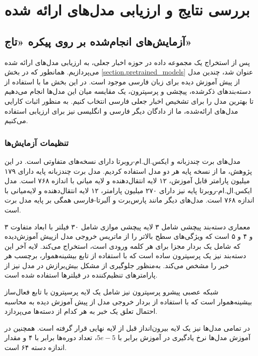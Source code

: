 \chapter{بررسی نتایج و ارزیابی مدل‌های ارائه شده}


\section{آزمایش‌های انجام‌شده بر روی پیکره «تاج»}
پس از استخراج یک مجموعه داده در حوزه اخبار جعلی، به ارزیابی مدل‌های ارائه شده می‌پردازیم. همانطور که در بخش \ref{section.pretrained_models} عنوان شد، چندین مدل از پیش آموزش‌ دیده برای زبان‌ فارسی موجود است. در این بخش ما با استفاده از دسته‌بند‌های ذکرشده، پیچشی و پرسپترون، یک مقایسه میان این مدل‌ها انجام می‌دهیم تا بهترین مدل‌ را برای تشخیص اخبار جعلی فارسی انتخاب کنیم. به منظور اثبات کارایی مدل‌های ارائه‌شده، ما از دادگان دیگر فارسی و انگلیسی نیز برای ارزیابی استفاده می‌کنیم.

\subsection{تنظیمات آزمایش‌ها}
مدل‌های برت چندزبانه و ایکس.ال.ام-روبرتا دارای نسخه‌های متفاوتی است. در این پژوهش، ما از نسخه‌ پایه هر دو مدل استفاده کردیم. مدل برت چند‌زبانه پایه دارای ۱۷۹ میلیون پارامتر قابل آموزش، ۱۲ لایه انتقال‌دهنده و لایه میانی با اندازه ۷۶۸ است. مدل ایکس.ال.ام-روبرتا پایه نیز دارای ۲۷۰ میلیون پارامتر، ۱۲ لایه انتقال‌دهنده و لایه‌میانی با اندازه ۷۶۸ است. مدل‌های دیگر مانند پارس‌برت و آلبرتا-فارسی همگی بر پایه مدل برت است.

معماری دسته‌بند پیچشی شامل ۳ لایه پیچشی موازی شامل ۳۰ فیلتر‌ با ابعاد متفاوت ۳ و ۴ و ۵ است که ویژگی‌های سطح بالاتر را از ماتریس خروجی مدل ازپیش‌ آموزش‌دیده که شامل یک بردار مجزا برای هر کلمه ورودی است، استخراج می‌کند. لایه آخر این دسته‌بند نیز یک پرسپترون ساده است که با استفاده از تابع بیشینه‌هموار، برچسب هر خبر را مشخص می‌کند. به‌منظور جلوگیری از مشکل بیش‌برازش در مدل نیز از پارامتر‌های تنظیم‌کننده در فیلتر‌ها استفاده شده ‌است.

شبکه عصبی پیشرو پرسپترون نیز شامل یک لایه پرسپترون با تابع فعال‌ساز بیشینه‌هموار است که با استفاده از بردار خروجی مدل از پیش آموزش‌ دیده به محاسبه احتمال تعلق یک خبر به هر کدام از دسته‌ها می‌پردازد.

در تمامی مدل‌ها نیز یک لایه بیرون‌انداز قبل از لایه‌ نهایی قرار گرفته‌ است. همچنین در آموزش مدل‌ها نرخ یادگیری در آموزش برابر با $5e-5$، تعداد دوره‌‌ها برابر با ۴ و مقدار اندازه دسته ۶۴  است.

